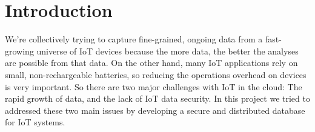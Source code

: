 \section{Introduction}
\label{sec:Introduction}
 We’re collectively trying to capture fine-grained, ongoing data from a fast-growing universe of IoT devices because the more data, the better the analyses are possible from that data. On the other hand, many IoT applications rely on small, non-rechargeable batteries, so reducing the operations overhead on devices is very important. So there are two major challenges with IoT in the cloud: The rapid growth of data, and the lack of IoT data security. In this project we tried to addressed these two main issues by developing a secure and distributed database for IoT systems. 


